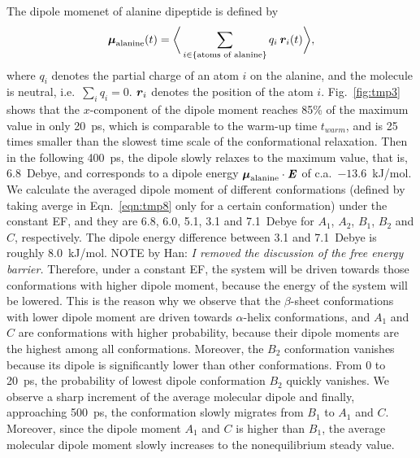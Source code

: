 \documentclass[a4paper,preprint,unsortedaddress,onecolumn]{revtex4-1}
\newcommand{\recheck}[1]{{\color{red} #1}}
\newcommand{\redc}[1]{{\color{red} #1}}
\newcommand{\vect}[1]{\textbf{\textit{#1}}}
\begin{document}
\redc{The dipole momenet of alanine dipeptide is defined by
\begin{align}\label{eqn:tmp8}
  \boldsymbol\mu_{\textrm{alanine}}(t) =
  \bigg\langle
  \sum_{i\in \{\textrm{atoms of alanine}\}}
  q_i\, \vect r_i(t)
  \bigg\rangle,
\end{align}
where $q_i$ denotes the partial charge of an atom $i$ on the alanine,
and the molecule is neutral, i.e.~$\sum_iq_i = 0$.
$\vect r_i$ denotes the position of the atom $i$.}
Fig.~\ref{fig:tmp3}
shows that the $x$-component of the dipole moment 
reaches 85\% of the maximum value in only 20~ps, which is comparable to
the warm-up time $t_{warm}$, and is 25 times
smaller than the slowest time scale of the conformational relaxation.
Then in the following 400~ps, the dipole slowly relaxes to the 
maximum value, that is, 
6.8~Debye, and  corresponds to a dipole energy
\redc{$\boldsymbol\mu_{\textrm{alanine}} \cdot \vect E$}
of c.a.~$-13.6$~kJ/mol.
We calculate the averaged dipole moment of different conformations
\redc{(defined by taking averge in Eqn.~\eqref{eqn:tmp8}
only for a certain conformation)}
under the constant EF, and they are 6.8, 6.0, 5.1, 3.1 and 7.1~Debye
for $A_1$, $A_2$, $B_1$, $B_2$ and $C$, respectively.
The dipole energy difference between 3.1 and 7.1~Debye is roughly 8.0~kJ/mol.
\recheck{NOTE by Han: \textit{
    I removed the discussion of the free energy barrier.}}
Therefore, under a constant EF, the system will be driven towards those
conformations with higher dipole moment, because the
energy of the system will be lowered.  This is the reason why
we observe that the $\beta$-sheet conformations with lower dipole moment
are driven towards $\alpha$-helix conformations, 
and $A_1$ and $C$ are conformations with higher probability, because their dipole moments are the highest
among all conformations. Moreover, the $B_2$ conformation vanishes because
its dipole is significantly lower than other conformations.
From 0 to 20~ps, the probability of
lowest dipole conformation $B_2$ quickly
vanishes. We observe a sharp increment of the average molecular dipole and finally, approaching  500~ps, the conformation slowly migrates from
$B_1$ to $A_1$ and $C$. Moreover, since the dipole moment $A_1$ and $C$
is higher than $B_1$, the average molecular dipole moment slowly increases
to the nonequilibrium steady value.
\end{document}
